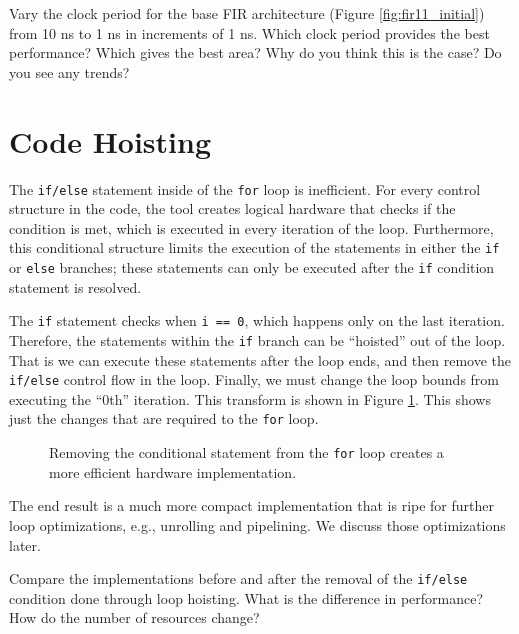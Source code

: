 \begin{exercise}
Vary the clock period for the base FIR architecture (Figure \ref{fig:fir11_initial}) from 10 ns to 1 ns in increments of 1 ns. Which clock period provides the best performance? Which gives the best area? Why do you think this is the case? Do you see any trends? 
\end{exercise}

\section{Code Hoisting}

The \lstinline{if/else} statement inside of the \lstinline{for} loop is inefficient.  For every control structure in the code, the \VHLS tool creates logical hardware that checks if the condition is met, which is executed in every iteration of the loop. Furthermore, this conditional structure limits the execution of the statements in either the \lstinline{if} or \lstinline{else} branches; these statements can only be executed after the \lstinline{if} condition statement is resolved.

The \lstinline{if} statement checks when \lstinline{i == 0}, which happens only on the last iteration. Therefore, the statements within the \lstinline{if} branch can be ``hoisted'' out of the loop. That is we can execute these statements after the loop ends, and then remove the \lstinline{if/else} control flow in the loop. Finally, we must change the loop bounds from executing the ``0th'' iteration. This transform is shown in Figure \ref{fig:fir11_ifelse}. This shows just the changes that are required to the \lstinline{for} loop. 

\begin{figure}

\caption{ Removing the conditional statement from the \lstinline{for} loop creates a more efficient hardware implementation. }
\label{fig:fir11_ifelse}
\end{figure}

The end result is a much more compact implementation that is ripe for further loop optimizations, e.g., unrolling and pipelining. We discuss those optimizations later.

\begin{exercise}
Compare the implementations before and after the removal of the \lstinline{if/else} condition done through loop hoisting. What is the difference in performance? How do the number of resources change?
\end{exercise}

